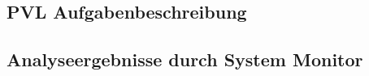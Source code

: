 \newpage

\subsection{PVL Aufgabenbeschreibung}



\subsection{Analyseergebnisse durch System Monitor}\label{ssec:analyse}





























